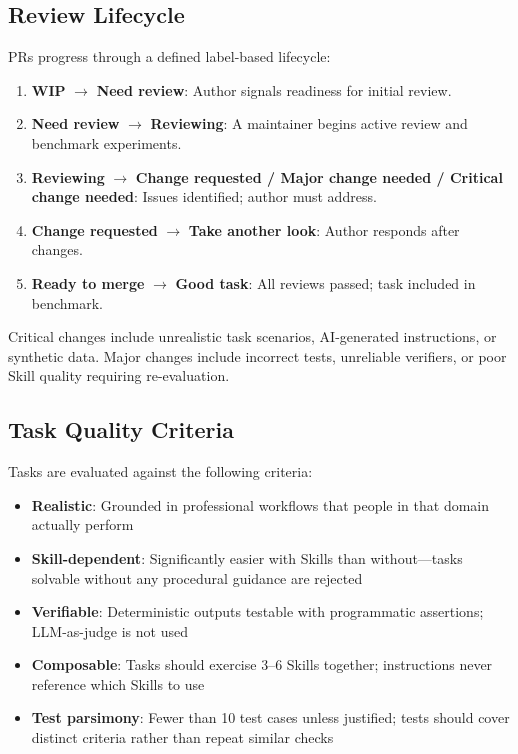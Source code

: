 \subsection{Review Lifecycle}

PRs progress through a defined label-based lifecycle:
\begin{enumerate}[nosep]
\item \textbf{WIP} $\rightarrow$ \textbf{Need review}: Author signals readiness for initial review.
\item \textbf{Need review} $\rightarrow$ \textbf{Reviewing}: A maintainer begins active review and benchmark experiments.
\item \textbf{Reviewing} $\rightarrow$ \textbf{Change requested / Major change needed / Critical change needed}: Issues identified; author must address.
\item \textbf{Change requested} $\rightarrow$ \textbf{Take another look}: Author responds after changes.
\item \textbf{Ready to merge} $\rightarrow$ \textbf{Good task}: All reviews passed; task included in benchmark.
\end{enumerate}

\noindent Critical changes include unrealistic task scenarios, AI-generated instructions, or synthetic data. Major changes include incorrect tests, unreliable verifiers, or poor Skill quality requiring re-evaluation.

\subsection{Task Quality Criteria}

Tasks are evaluated against the following criteria:
\begin{itemize}[nosep]
\item \textbf{Realistic}: Grounded in professional workflows that people in that domain actually perform
\item \textbf{Skill-dependent}: Significantly easier with Skills than without---tasks solvable without any procedural guidance are rejected
\item \textbf{Verifiable}: Deterministic outputs testable with programmatic assertions; LLM-as-judge is not used
\item \textbf{Composable}: Tasks should exercise 3--6 Skills together; instructions never reference which Skills to use
\item \textbf{Test parsimony}: Fewer than 10 test cases unless justified; tests should cover distinct criteria rather than repeat similar checks
\end{itemize}


